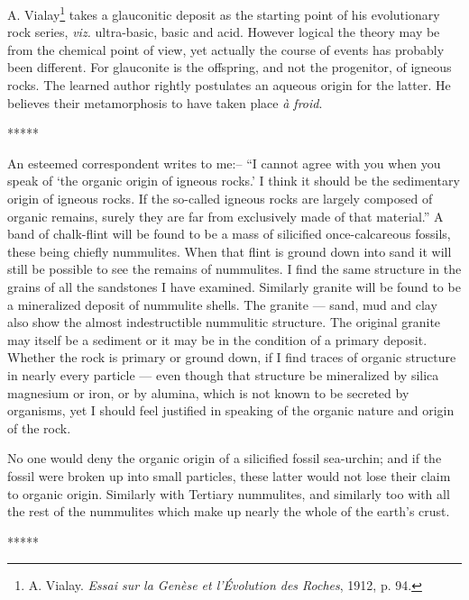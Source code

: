\documentclass[a4paper, 12pt, oneside]{article}
\begin{document}
A. Vialay\footnote{A. Vialay. \emph{Essai sur la Genèse et l'Évolution des Roches}, 1912, p. 94.} takes a glauconitic deposit as the starting point of his evolutionary rock series, \emph{viz.} ultra-basic, basic and acid. However logical the theory may be from the chemical point of view, yet actually the course of events has probably been different. For glauconite is the offspring, and not the progenitor, of igneous rocks. The learned author rightly postulates an aqueous origin for the latter. He believes their metamorphosis to have taken place \emph{à froid}.

\centerline{*\hspace{15mm}*\hspace{15mm}*\hspace{15mm}*\hspace{15mm}*}
\bigskip

An esteemed correspondent writes to me:-- ``I cannot agree with you when you speak of `the organic origin of igneous rocks.' I think it should be the sedimentary origin of igneous rocks. If the so-called igneous rocks are largely composed of organic remains, surely they are far from exclusively made of that material.'' A band of chalk-flint will be found to be a mass of silicified once-calcareous fossils, these being chiefly nummulites. When that flint is ground down into sand it will still be possible to see the remains of nummulites. I find the same structure in the grains of all the sandstones I have examined. Similarly granite will be found to be a mineralized deposit of nummulite shells. The granite --- sand, mud and clay also show the almost indestructible nummulitic structure. The original granite may itself be a sediment or it may be in the condition of a primary deposit. Whether the rock is primary or ground down, if I find traces of organic structure in nearly every particle --- even though that structure be mineralized by silica magnesium or iron, or by alumina, which is not known to be secreted by organisms, yet I should feel justified in speaking of the organic nature and origin of the rock.

No one would deny the organic origin of a silicified fossil sea-urchin; and if the fossil were broken up into small particles, these latter would not lose their claim to organic origin. Similarly with Tertiary nummulites, and similarly too with all the rest of the nummulites which make up nearly the whole of the earth's crust.

\centerline{*\hspace{15mm}*\hspace{15mm}*\hspace{15mm}*\hspace{15mm}*}
\bigskip
\end{document}
